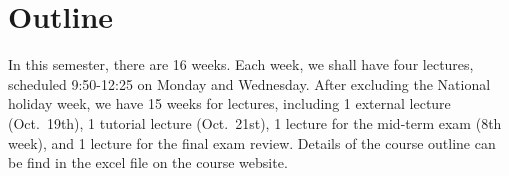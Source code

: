 \documentclass[onecolumn,pra,superscriptaddress]{revtex4-1}
\begin{document}
\section{Outline}
In this semester, there are 16 weeks. Each week, we shall have four lectures, scheduled 9:50-12:25 on Monday and Wednesday. After excluding the National holiday week, we have 15 weeks for lectures, including 1 external lecture (Oct.~19th), 1 tutorial lecture (Oct.~21st), 1 lecture for the mid-term exam (8th week), and 1 lecture for the final exam review. Details of the course outline can be find in the excel file on the course website. %
%
%
%
%
%
\end{document}
